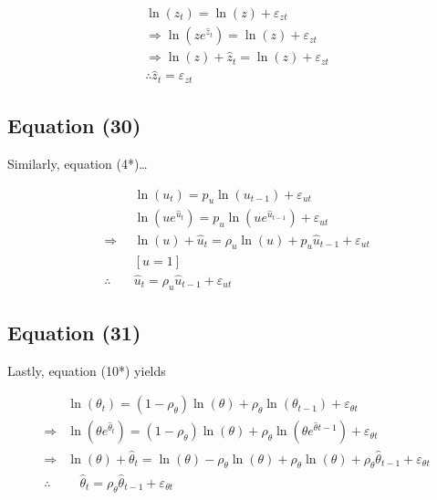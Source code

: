 \documentclass[11pt,preprint, authoryear]{elsarticle}
\numberwithin{equation}{section}
\numberwithin{figure}{section}
\numberwithin{table}{section}
\begin{document}
\[\begin{aligned}
\ln(z_t)=\ln(z) + \varepsilon_{z t}\\
\Rightarrow \ln\left(z e^{\hat{z}_t}\right) =\ln (z)+\varepsilon_{z t}\\
\Rightarrow  \ln (z)+\hat{z}_{t}=\ln (z)+\varepsilon_{z t}\\
\therefore \hat{z}_t = \varepsilon_{z t}
\end{aligned}\]

\hypertarget{equation-30}{%
\subsection{Equation (30)}\label{equation-30}}

Similarly, equation (4*)\ldots{}

\[\begin{aligned}
& \ln \left(u_{t}\right)=p_{u} \ln \left(u_{t-1}\right)+\varepsilon_{u t} \\
& \ln \left(u e^{\hat{u}_{t}}\right)=p_{u} \ln \left(u e^{\hat{u}_{t-1}}\right)+\varepsilon_{u t} \\
\Rightarrow & \ln (u)+\hat{u}_{t}=\rho_{u} \ln (u)+p_{u} \hat{u}_{t-1}+\varepsilon_{u t} \\
&[u =1] \\
\therefore \quad &\hat{u}_{t} =\rho_{u} \hat{u}_{t-1}+\varepsilon_{u t}
\end{aligned}\]

\hypertarget{equation-31}{%
\subsection{Equation (31)}\label{equation-31}}

Lastly, equation (10*) yields

\[\begin{aligned}
& \ln \left(\theta_{t}\right)=\left(1-\rho_{\theta}\right) \ln (\theta)+\rho_{\theta} \ln \left(\theta_{t-1}\right)+\varepsilon_{\theta t} \\
\Rightarrow & \ln \left(\theta e^{\hat{\theta}_{t}}\right)=\left(1-\rho_{\theta}\right) \ln (\theta)+\rho_{\theta} \ln \left(\theta e^{\hat{\theta}{t-1}}\right)+\varepsilon_{\theta t} \\
\Rightarrow & \ln (\theta)+\hat{\theta}_{t}=\ln (\theta)-\rho_{\theta} \ln (\theta)+\rho_{\theta} \ln (\theta)+\rho_{\theta} \hat{\theta}_{t-1}+\varepsilon_{\theta t} \\
\therefore & \quad \hat{\theta}_{t}=\rho_{\theta} \hat{\theta}_{t-1}+\varepsilon_{\theta t}
\end{aligned}\]
\end{document}
